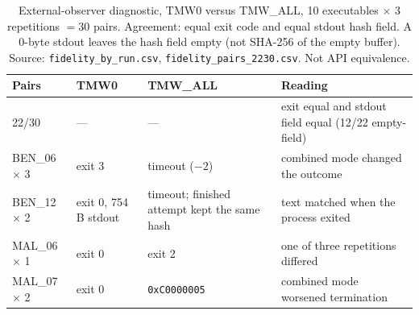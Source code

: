 
\begin{table}[!t]
\centering
\caption{External-observer diagnostic, TMW0 versus TMW\_ALL, 10 executables $\times$ 3 repetitions $= 30$ pairs. Agreement: equal exit code and equal stdout hash field. A 0-byte stdout leaves the hash field empty (not SHA-256 of the empty buffer). Source: \texttt{fidelity\_by\_run.csv}, \texttt{fidelity\_pairs\_2230.csv}. Not API equivalence.}
\label{tab:obs2230}
\begin{tabular}{lp{3.2cm}p{3.6cm}p{4.2cm}}
\hline
Pairs & TMW0 & TMW\_ALL & Reading \\
\hline
22/30 & --- & --- & exit equal and stdout field equal (12/22 empty-field) \\
BEN\_06 $\times$ 3 & exit 3 & timeout ($-2$) & combined mode changed the outcome \\
BEN\_12 $\times$ 2 & exit 0, 754\,B stdout & timeout; finished attempt kept the same hash & text matched when the process exited \\
MAL\_06 $\times$ 1 & exit 0 & exit 2 & one of three repetitions differed \\
MAL\_07 $\times$ 2 & exit 0 & \texttt{0xC0000005} & combined mode worsened termination \\
\hline
\end{tabular}
\end{table}

